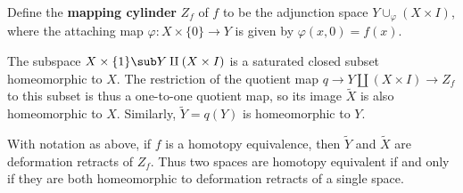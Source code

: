 Define the \textbf{mapping cylinder} $Z_f$ of $f$ to be the adjunction space $Y\cup_\varphi(X\times I)$, where the attaching map $\varphi:X\times\{0\}\to Y$ is given by $\varphi(x,0)=f(x)$.\par
The subspace $X\times\{1\}\sub Y\amalg(X\times I)$ is a saturated closed subset homeomorphic to $X$. The restriction of the quotient map $q\to Y\amalg(X\times I)\to Z_f$ to this subset is thus a one-to-one quotient map, so its image $\widetilde{X}$ is also homeomorphic to $X$. Similarly, $\widetilde{Y}=q(Y)$ is homeomorphic to $Y$.
\begin{proposition}
With notation as above, if $f$ is a homotopy equivalence, then $\widetilde{Y}$
and $\widetilde{X}$ are deformation retracts of $Z_f$. Thus two spaces are homotopy equivalent if and only if they are both homeomorphic to deformation retracts of a single space.
\end{proposition}
